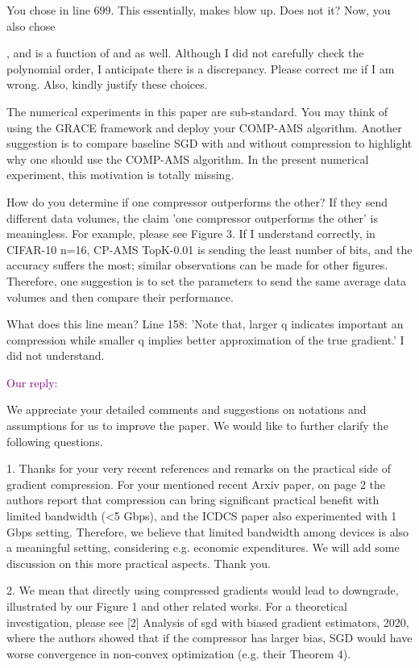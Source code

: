 \documentclass{article}
\begin{document}
You chose  in line 699. This essentially, makes  blow up. Does not it? Now, you also chose 
 
, and  is a function of  and  as well. Although I did not carefully check the polynomial order, I anticipate there is a discrepancy. Please correct me if I am wrong. Also, kindly justify these choices.

The numerical experiments in this paper are sub-standard. You may think of using the GRACE framework and deploy your COMP-AMS algorithm. Another suggestion is to compare baseline SGD with and without compression to highlight why one should use the COMP-AMS algorithm. In the present numerical experiment, this motivation is totally missing.

How do you determine if one compressor outperforms the other? If they send different data volumes, the claim 'one compressor outperforms the other' is meaningless. For example, please see Figure 3. If I understand correctly, in CIFAR-10 n=16, CP-AMS TopK-0.01 is sending the least number of bits, and the accuracy suffers the most; similar observations can be made for other figures. Therefore, one suggestion is to set the parameters to send the same average data volumes and then compare their performance.

What does this line mean? Line 158: 'Note that, larger q indicates important an compression while smaller q implies better approximation of the true gradient.' I did not understand.


\textcolor{purple}{Our reply:}

We appreciate your detailed comments and suggestions on notations and assumptions for us to improve the paper. We would like to further clarify the following questions.

1. Thanks for your very recent references and remarks on the practical side of gradient compression. For your mentioned recent Arxiv paper, on page 2 the authors report that compression can bring significant practical benefit with limited bandwidth (<5 Gbps), and the ICDCS paper also experimented with 1 Gbps setting. 
Therefore, we believe that limited bandwidth among devices is also a meaningful setting, considering e.g. economic expenditures. We will add some discussion on this more practical aspects. Thank you.

2. We mean that directly using compressed gradients would lead to downgrade, illustrated by our Figure 1 and other related works. For a theoretical investigation, please see [2] Analysis of sgd with biased gradient estimators, 2020, where the authors showed that if the compressor has larger bias, SGD would have worse convergence in non-convex optimization (e.g. their Theorem 4).
\end{document}

